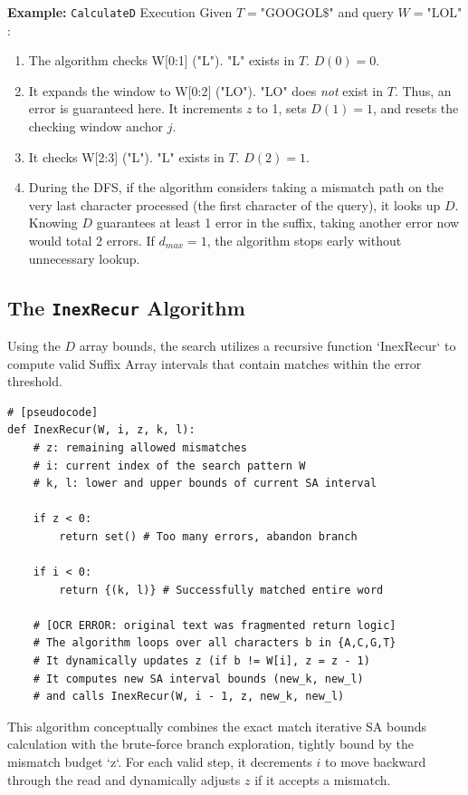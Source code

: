 \textbf{Example:} \texttt{CalculateD} Execution
Given $T=\text{"GOOGOL\$"}$ and query $W=\text{"LOL"}$:
\begin{enumerate}
    \item The algorithm checks W[0:1] ("L"). "L" exists in $T$. $D(0) = 0$.
    \item It expands the window to W[0:2] ("LO"). "LO" does \textit{not} exist in $T$. Thus, an error is guaranteed here. It increments $z$ to 1, sets $D(1) = 1$, and resets the checking window anchor $j$.
    \item It checks W[2:3] ("L"). "L" exists in $T$. $D(2) = 1$.
    \item During the DFS, if the algorithm considers taking a mismatch path on the very last character processed (the first character of the query), it looks up $D$. Knowing $D$ guarantees at least 1 error in the suffix, taking another error now would total 2 errors. If $d_{max}=1$, the algorithm stops early without unnecessary lookup.
\end{enumerate}

\subsection{The \texttt{InexRecur} Algorithm}

Using the $D$ array bounds, the search utilizes a recursive function `InexRecur` to compute valid Suffix Array intervals that contain matches within the error threshold. 

\begin{verbatim}
# [pseudocode]
def InexRecur(W, i, z, k, l):
    # z: remaining allowed mismatches
    # i: current index of the search pattern W
    # k, l: lower and upper bounds of current SA interval
    
    if z < 0:
        return set() # Too many errors, abandon branch
        
    if i < 0:
        return {(k, l)} # Successfully matched entire word
        
    # [OCR ERROR: original text was fragmented return logic]
    # The algorithm loops over all characters b in {A,C,G,T}
    # It dynamically updates z (if b != W[i], z = z - 1)
    # It computes new SA interval bounds (new_k, new_l)
    # and calls InexRecur(W, i - 1, z, new_k, new_l)
\end{verbatim}

This algorithm conceptually combines the exact match iterative SA bounds calculation with the brute-force branch exploration, tightly bound by the mismatch budget `z`. For each valid step, it decrements $i$ to move backward through the read and dynamically adjusts $z$ if it accepts a mismatch.

